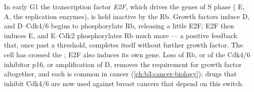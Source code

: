 \begin{proposition}\label{prop:b3:cell-cycle-apoptosis:rb}
In early G1 the transcription factor \emph{E2F}, which drives the genes
of S phase ( E,  A, the replication enzymes), is held
inactive by the \emph{} Rb. Growth factors induce
 D, and  D--Cdk4/6 begins to phosphorylate Rb, releasing a
little E2F; E2F then induces  E, and  E--Cdk2 phosphorylates
Rb much more --- a positive feedback that, once past a threshold,
completes itself without further growth factor. The cell has crossed
the ; E2F also induces its own gene. Loss of Rb, or
of the Cdk4/6 inhibitor p16, or amplification of  D, removes
the requirement for growth factor altogether, and each is common in
cancer (\cref{ch:b3:cancer-biology}); drugs that inhibit Cdk4/6 are now
used against breast cancers that depend on this switch.
\end{proposition}

